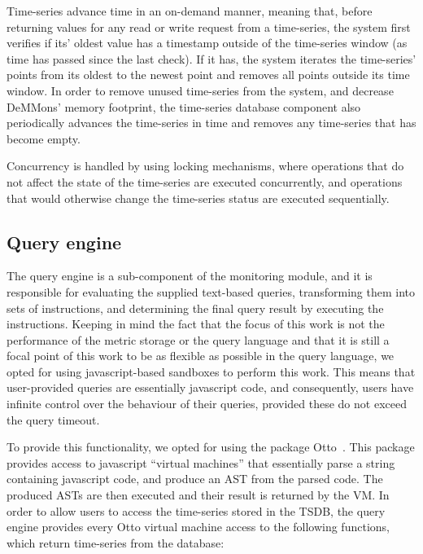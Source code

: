 Time-series advance time in an on-demand manner, meaning that, before returning values for any read or write request from a time-series, the system first verifies if its' oldest value has a timestamp outside of the time-series window (as time has passed since the last check). If it has, the system iterates the time-series' points from its oldest to the newest point and removes all points outside its time window. In order to remove unused time-series from the system, and decrease DeMMons' memory footprint, the time-series database component also periodically advances the time-series in time and removes any time-series that has become empty.

Concurrency is handled by using locking mechanisms, where operations that do not affect the state of the time-series are executed concurrently, and operations that would otherwise change the time-series status are executed sequentially. 

\subsection{Query engine} \label{sec:mon_module:query_engine}

The query engine is a sub-component of the monitoring module, and it is responsible for evaluating the supplied text-based queries, transforming them into sets of instructions, and determining the final query result by executing the instructions. Keeping in mind the fact that the focus of this work is not the performance of the metric storage or the query language and that it is still a focal point of this work to be as flexible as possible in the query language, we opted for using javascript-based sandboxes to perform this work. This means that user-provided queries are essentially javascript code, and consequently, users have infinite control over the behaviour of their queries, provided these do not exceed the query timeout.

To provide this functionality, we opted for using the package Otto~\cite{otto}. This package provides access to javascript ``virtual machines'' that essentially parse a string containing javascript code, and produce an AST from the parsed code. The produced ASTs are then executed and their result is returned by the VM. In order to allow users to access the time-series stored in the TSDB, the query engine provides every Otto virtual machine access to the following functions, which return time-series from the database:

